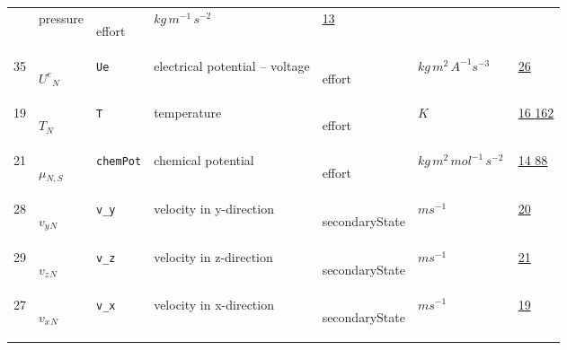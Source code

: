 \begin{longtable}{|p{1cm}|p{2.5cm}|p{4.5cm}|p{8cm}|p{3.0cm}|p{3cm}|p{1cm}|}
             & pressure
             & \begin{lay}effort \end{lay}
             & $ kg \,m^{-1} \,s^{-2} \, $
             &                 \hyperlink{"e:13"}{ 13 }
                 \\
            35
             & \hypertarget{"v:35"}{ $ {{U^e}}{_{N}} $}
             & \verb|Ue|
             & electrical potential -- voltage
             & \begin{lay}effort \end{lay}
             & $ kg \,m^{2} \,A^{-1} s^{-3} \, $
             &                 \hyperlink{"e:26"}{ 26 }
                 \\
            19
             & \hypertarget{"v:19"}{ $ {T}{_{N}} $}
             & \verb|T|
             & temperature
             & \begin{lay}effort \end{lay}
             & $ K \, $
             &                 \hyperlink{"e:16"}{ 16 }
                                 \hyperlink{"e:162"}{ 162 }
                 \\
            21
             & \hypertarget{"v:21"}{ $ {{\mu}}{_{N, S}} $}
             & \verb|chemPot|
             & chemical potential
             & \begin{lay}effort \end{lay}
             & $ kg \,m^{2} \,mol^{-1} \,s^{-2} \, $
             &                 \hyperlink{"e:14"}{ 14 }
                                 \hyperlink{"e:88"}{ 88 }
                 \\
            28
             & \hypertarget{"v:28"}{ $ {{v_y}}{_{N}} $}
             & \verb|v_y|
             & velocity in y-direction
             & \begin{lay}secondaryState \end{lay}
             & $ m s^{-1} \, $
             &                 \hyperlink{"e:20"}{ 20 }
                 \\
            29
             & \hypertarget{"v:29"}{ $ {{v_z}}{_{N}} $}
             & \verb|v_z|
             & velocity in z-direction
             & \begin{lay}secondaryState \end{lay}
             & $ m s^{-1} \, $
             &                 \hyperlink{"e:21"}{ 21 }
                 \\
            27
             & \hypertarget{"v:27"}{ $ {{v_x}}{_{N}} $}
             & \verb|v_x|
             & velocity in x-direction
             & \begin{lay}secondaryState \end{lay}
             & $ m s^{-1} \, $
             &                 \hyperlink{"e:19"}{ 19 }
                 \\
    \end{longtable}